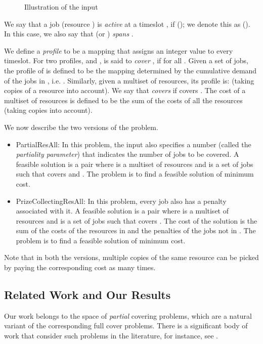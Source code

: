 \documentclass[11pt]{article}
\newcommand{\PResAll}{{\sc PartialResAll}}
\newcommand{\PCResAll}{{\sc PrizeCollectingResAll}}
\begin{document}
\begin{figure*}[t]
\begin{center}
\end{center}
\caption{Illustration of the input}
\label{fig:cc}
\end{figure*}

We say that a job  (resource ) is {\it active} at a timeslot , 
if  (); we  denote this as  ().
In this case, we also say that  (or ) {\em spans} .



We define a {\em profile}  to be a mapping that assigns an integer value 
to every timeslot. For two profiles,  and ,  is said to {\em cover} , 
if  for all .
Given a set  of jobs, the profile  of  is defined to be the mapping determined by 
the cumulative demand of the jobs in , i.e. .
Similarly, given a multiset  of resources, its profile is: 
(taking copies of a resource into account). 
We say that  {\em covers}  if  covers . 
The cost of a multiset of resources  is defined to be the sum of the costs of all the resources 
(taking copies into account).

We now describe the two versions of the problem.
\begin{itemize}
\item  {\PResAll}: In this problem, the input also specifies a number  (called the {\em partiality parameter})
       that indicates the 
	number of jobs to be covered. A feasible solution is a pair  where  is a multiset of resources
	and  is a set of jobs such that  covers  and .
	The problem is to find a feasible solution of minimum cost.
\item  {\PCResAll}: In this problem, every job  also has a penalty  associated with it.
	A feasible solution is a pair  where  is a multiset of resources
	and  is a set of jobs such that  covers .
	The cost of the solution is the sum of the 
	costs of the resources in  and the penalties of the jobs not in .
	The problem is to find a feasible solution of minimum cost.
\end{itemize}
Note that in both the versions, multiple copies of the same resource can be picked
by paying the corresponding cost as many times.





\subsection{Related Work and Our Results}
Our work belongs to the space of {\em partial} covering problems, which are a 
natural variant of the corresponding full cover problems. There is a significant body of work 
that consider such problems in the literature, for instance, see \cite{Garg05,Bar01,JV01,KPS11,GKS04}.
\end{document}
